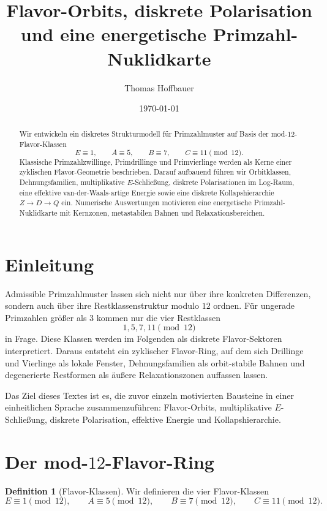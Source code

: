 \documentclass[11pt,a4paper]{article}
\title{Flavor-Orbits, diskrete Polarisation und eine energetische Primzahl-Nuklidkarte}
\author{Thomas Hoffbauer}
\date{\today}
\theoremstyle{definition}
\newtheorem{definition}{Definition}[section]
\theoremstyle{plain}
\begin{document}
	\maketitle
	
	\begin{abstract}
		Wir entwickeln ein diskretes Strukturmodell für Primzahlmuster auf Basis der mod-$12$-Flavor-Klassen
		\[
		E\equiv 1,\qquad A\equiv 5,\qquad B\equiv 7,\qquad C\equiv 11 \pmod{12}.
		\]
		Klassische Primzahlzwillinge, Primdrillinge und Primvierlinge werden als Kerne einer zyklischen Flavor-Geometrie beschrieben. Darauf aufbauend führen wir Orbitklassen, Dehnungsfamilien, multiplikative $E$-Schließung, diskrete Polarisationen im Log-Raum, eine effektive van-der-Waals-artige Energie sowie eine diskrete Kollapshierarchie $Z\to D\to Q$ ein. Numerische Auswertungen motivieren eine energetische Primzahl-Nuklidkarte mit Kernzonen, metastabilen Bahnen und Relaxationsbereichen.
	\end{abstract}
	
	\tableofcontents
	
	\section{Einleitung}
	
	Admissible Primzahlmuster lassen sich nicht nur über ihre konkreten Differenzen, sondern auch über ihre Restklassenstruktur modulo $12$ ordnen. Für ungerade Primzahlen größer als $3$ kommen nur die vier Restklassen
	\[
	1,5,7,11 \pmod{12}
	\]
	in Frage. Diese Klassen werden im Folgenden als diskrete Flavor-Sektoren interpretiert. Daraus entsteht ein zyklischer Flavor-Ring, auf dem sich Drillinge und Vierlinge als lokale Fenster, Dehnungsfamilien als orbit-stabile Bahnen und degenerierte Restformen als äußere Relaxationszonen auffassen lassen.
	
	Das Ziel dieses Textes ist es, die zuvor einzeln motivierten Bausteine in einer einheitlichen Sprache zusammenzuführen: Flavor-Orbits, multiplikative $E$-Schließung, diskrete Polarisation, effektive Energie und Kollapshierarchie.
	
	\section{Der mod-$12$-Flavor-Ring}
	
	\begin{definition}[Flavor-Klassen]
		Wir definieren die vier Flavor-Klassen
		\[
		E\equiv 1 \pmod{12},\qquad
		A\equiv 5 \pmod{12},\qquad
		B\equiv 7 \pmod{12},\qquad
		C\equiv 11 \pmod{12}.
		\]
	\end{definition}
	
\end{document}

